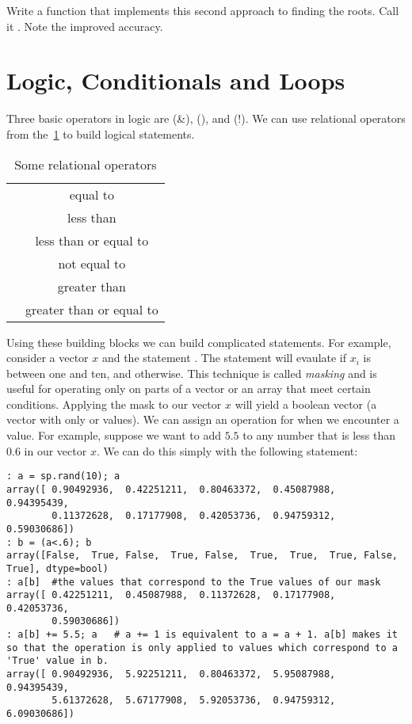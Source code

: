 \begin{problem}
Write a function that implements this second approach to finding the roots. Call it .  Note the improved accuracy.
\end{problem}

\section*{Logic, Conditionals and Loops}
Three basic operators in logic are  (\&),  (\textbar), and  (!). We can use relational operators from the~\ref{tbl:relops} to build logical statements.

\begin{table}[h!]
\begin{center}
\begin{tabular}{|c|c|}
	\hline
	\li{==} & equal to\\
        \li{<} & less than\\
	\li{<=} & less than or equal to\\
	\li{\!=} & not equal to\\
	\li{>} & greater than\\
	\li{>=} & greater than or equal to\\
	\hline
\end{tabular}
\caption{Some relational operators}
\label{tbl:relops}
\end{center}
\end{table}

Using these building blocks we can build complicated statements. For example, consider a vector $x$ and the statement .  The statement will evaulate  if $x_i$ is between one and ten, and  otherwise.  This technique is called \emph{masking} and is useful for operating only on parts of a vector or an array that meet certain conditions.  Applying the mask to our vector $x$ will yield a boolean vector (a vector with only  or  values).  We can assign an operation for when we encounter a  value.  For example, suppose we want to add $5.5$ to any number that is less than $0.6$ in our vector $x$.  We can do this simply with the following statement:
\begin{lstlisting}[style=python]
: a = sp.rand(10); a
array([ 0.90492936,  0.42251211,  0.80463372,  0.45087988,  0.94395439,
        0.11372628,  0.17177908,  0.42053736,  0.94759312,  0.59030686])
: b = (a<.6); b
array([False,  True, False,  True, False,  True,  True,  True, False,  True], dtype=bool)
: a[b]  #the values that correspond to the True values of our mask
array([ 0.42251211,  0.45087988,  0.11372628,  0.17177908,  0.42053736,
        0.59030686])
: a[b] += 5.5; a   # a += 1 is equivalent to a = a + 1. a[b] makes it so that the operation is only applied to values which correspond to a 'True' value in b.
array([ 0.90492936,  5.92251211,  0.80463372,  5.95087988,  0.94395439,
        5.61372628,  5.67177908,  5.92053736,  0.94759312,  6.09030686])
\end{lstlisting}

